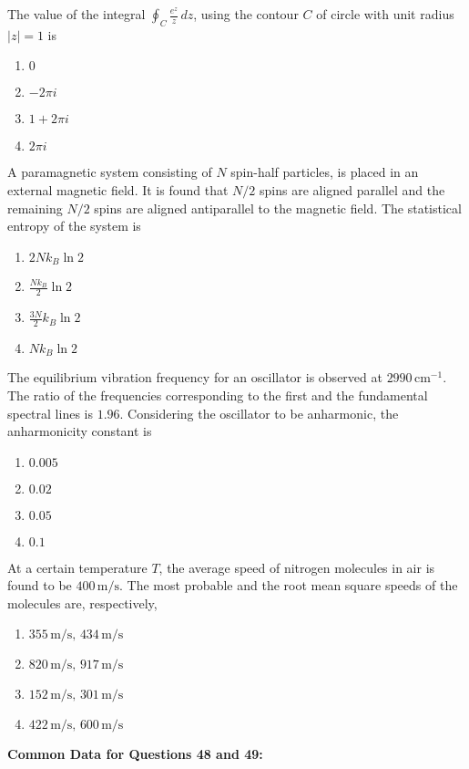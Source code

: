     

    \item The value of the integral $\oint_C \frac{e^z}{z} \, dz$, using the contour $C$ of circle with unit radius $|z| = 1$ is
    \begin{enumerate}
        \item $0$
        \item $-2 \pi i$
        \item $1 + 2 \pi i$
        \item $2 \pi i$
    \end{enumerate}

    \item A paramagnetic system consisting of $N$ spin-half particles, is placed in an external magnetic field. It is found that $N/2$ spins are aligned parallel and the remaining $N/2$ spins are aligned antiparallel to the magnetic field. The statistical entropy of the system is
    \begin{enumerate}
        \item $2 N k_B \ln 2$
        \item $\frac{N k_B}{2} \ln 2$
        \item $\frac{3 N}{2} k_B \ln 2$
        \item $N k_B \ln 2$
    \end{enumerate}

    \item The equilibrium vibration frequency for an oscillator is observed at $2990 \, \text{cm}^{-1}$. The ratio of the frequencies corresponding to the first and the fundamental spectral lines is $1.96$. Considering the oscillator to be anharmonic, the anharmonicity constant is
    \begin{enumerate}
        \item $0.005$
        \item $0.02$
        \item $0.05$
        \item $0.1$
    \end{enumerate}

    \item At a certain temperature $T$, the average speed of nitrogen molecules in air is found to be $400 \, \text{m/s}$. The most probable and the root mean square speeds of the molecules are, respectively,
    \begin{enumerate}
        \item $355 \, \text{m/s}, \, 434 \, \text{m/s}$
        \item $820 \, \text{m/s}, \, 917 \, \text{m/s}$
        \item $152 \, \text{m/s}, \, 301 \, \text{m/s}$
        \item $422 \, \text{m/s}, \, 600 \, \text{m/s}$
    \end{enumerate}
\raggedright
\textbf{Common Data for Questions 48 and 49:}

